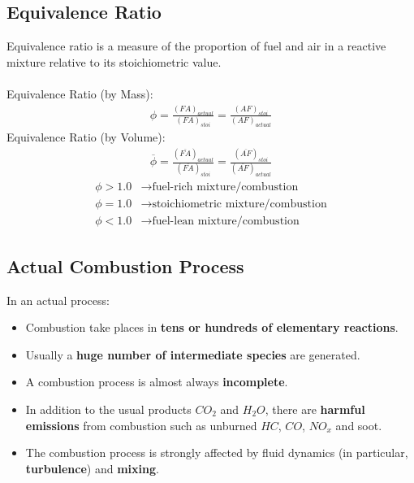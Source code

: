\subsection{Equivalence Ratio}
Equivalence ratio is a measure of the proportion of fuel and air in a reactive mixture relative to its stoichiometric value. \\\\
Equivalence Ratio (by Mass):
\begin{gather}
  \phi = \frac{(FA)_{actual}}{(FA)_{stoi}} = \frac{(AF)_{stoi}}{(AF)_{actual}}
\end{gather}
Equivalence Ratio (by Volume):
\begin{gather}
  \overline{\phi} = \frac{(\overline{FA})_{actual}}{(\overline{FA})_{stoi}} = \frac{(\overline{AF})_{stoi}}{(\overline{AF})_{actual}}
\end{gather}
\begin{align*}
  \phi > 1.0 & \longrightarrow \text{fuel-rich mixture/combustion}      \\[5pt]
  \phi = 1.0 & \longrightarrow \text{stoichiometric mixture/combustion} \\[5pt]
  \phi < 1.0 & \longrightarrow \text{fuel-lean mixture/combustion}
\end{align*}
\subsection{Actual Combustion Process}
In an actual process:
\begin{itemize}[noitemsep]
  \item Combustion take places in \textbf{tens or hundreds of elementary reactions}.
  \item Usually a \textbf{huge number of intermediate species} are generated.
  \item A combustion process is almost always \textbf{incomplete}.
  \item In addition to the usual products $CO_2$ and $H_2O$, there are \textbf{harmful emissions} from combustion such as unburned $HC$, $CO$, $NO_x$ and soot.
  \item The combustion process is strongly affected by fluid dynamics (in particular, \textbf{turbulence}) and \textbf{mixing}.
\end{itemize}
